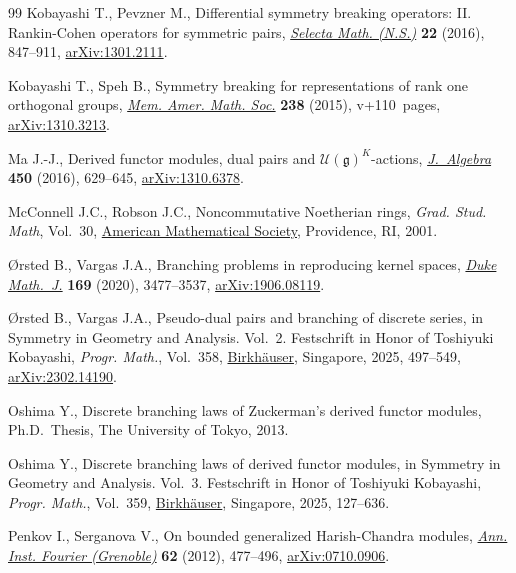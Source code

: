 \begin{thebibliography}{99}
Kobayashi T., Pevzner M., Differential symmetry breaking operators: {II}.
 {R}ankin-{C}ohen operators for symmetric pairs,
 \href{https://doi.org/10.1007/s00029-015-0208-8}{\textit{Selecta Math.
 (N.S.)}} \textbf{22} (2016), 847--911,
 \href{http://arxiv.org/abs/1301.2111}{arXiv:1301.2111}.

Kobayashi T., Speh B., Symmetry breaking for representations of rank one
 orthogonal groups, \href{https://doi.org/10.1090/memo/1126}{\textit{Mem.
 Amer. Math. Soc.}} \textbf{238} (2015), v+110~pages,
 \href{http://arxiv.org/abs/1310.3213}{arXiv:1310.3213}.

Ma J.-J., Derived functor modules, dual pairs and
 {$\mathcal{U}(\mathfrak{g})^K$}-actions,
 \href{https://doi.org/10.1016/j.jalgebra.2015.11.016}{\textit{J.~Algebra}}
 \textbf{450} (2016), 629--645,
 \href{http://arxiv.org/abs/1310.6378}{arXiv:1310.6378}.

McConnell J.C., Robson J.C., Noncommutative {N}oetherian rings, \textit{Grad.
 Stud. Math}, Vol.~30, \href{https://doi.org/10.1090/gsm/030}{American Mathematical Society},
 Providence, RI, 2001.

{\O}rsted B., Vargas J.A., Branching problems in reproducing kernel spaces,
 \href{https://doi.org/10.1215/00127094-2020-0032}{\textit{Duke Math.~J.}}
 \textbf{169} (2020), 3477--3537,
 \href{http://arxiv.org/abs/1906.08119}{arXiv:1906.08119}.

{\O}rsted B., Vargas J.A., Pseudo-dual pairs and branching of discrete series,
 in Symmetry in Geometry and Analysis. {V}ol.~2. {F}estschrift in Honor of
 {T}oshiyuki {K}obayashi, \textit{Progr. Math.}, Vol.~358,
 \href{https://doi.org/10.1007/978-981-97-7662-7_11}{Birkh\"auser}, Singapore,
 2025, 497--549, \href{http://arxiv.org/abs/2302.14190}{arXiv:2302.14190}.

Oshima Y., Discrete branching laws of {Z}uckerman's derived functor modules,
 Ph.D.~Thesis, {T}he University of Tokyo, 2013.

Oshima Y., Discrete branching laws of derived functor modules, in Symmetry in
 Geometry and Analysis. {V}ol.~3. {F}estschrift in Honor of {T}oshiyuki
 {K}obayashi, \textit{Progr. Math.}, Vol.~359,
 \href{https://doi.org/10.1007/978-981-97-7666-5_5}{Birkh\"auser}, Singapore,
 2025, 127--636.

Penkov I., Serganova V., On bounded generalized {H}arish-{C}handra modules,
 \href{https://doi.org/10.5802/aif.2685}{\textit{Ann. Inst. Fourier
 (Grenoble)}} \textbf{62} (2012), 477--496,
 \href{http://arxiv.org/abs/0710.0906}{arXiv:0710.0906}.


\end{thebibliography}
